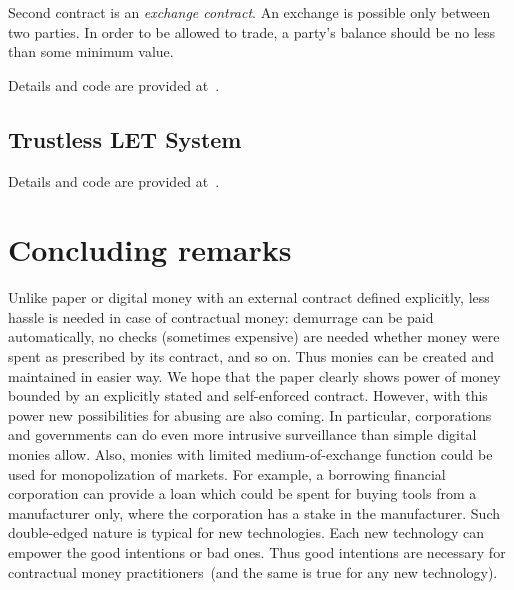 \documentclass[]{llncs}   %
\begin{document}
Second contract is an {\em exchange contract}. An exchange is possible only between two parties. In order to be allowed to trade, a party's balance should be no less than some minimum value. 

Details and code are provided at~\cite{lets-trusted}.


\subsection{Trustless LET System}
\label{sec-trustless}

Details and code are provided at~\cite{lets-trustless}.


\section{Concluding remarks}
\label{sec-conslusion}

Unlike paper or digital money with an external contract defined explicitly, less hassle is needed in case of contractual money: demurrage can be paid automatically, no checks (sometimes expensive) are needed whether money were spent as prescribed
by its contract, and so on. Thus monies can be created and maintained in easier way. We hope that the paper clearly shows power of money bounded by an explicitly stated and self-enforced contract. However, with this power new possibilities for abusing are also coming. In particular, corporations and governments can do even more intrusive surveillance than simple digital monies allow.  Also, monies with limited medium-of-exchange function could be used for monopolization of markets. For example, a borrowing financial corporation can provide a loan which could be spent for buying tools from a manufacturer only, where the corporation has a stake in the manufacturer. Such double-edged nature is typical for new technologies. Each new technology can empower the good intentions or bad ones. Thus good intentions are necessary for contractual money practitioners~(and the same is true for any new technology).



\end{document}
